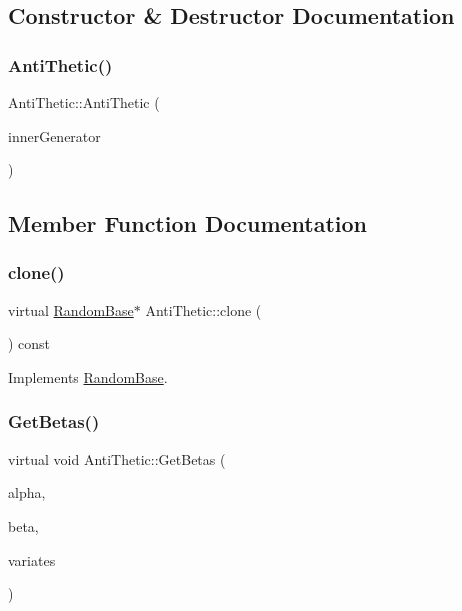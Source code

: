 \subsection{Constructor \& Destructor Documentation}
\hypertarget{classAntiThetic_aa79b36bdd2f341f5ad2b41f141950044}{}\label{classAntiThetic_aa79b36bdd2f341f5ad2b41f141950044} 
\subsubsection{\texorpdfstring{Anti\+Thetic()}{AntiThetic()}}
{\footnotesize\ttfamily Anti\+Thetic\+::\+Anti\+Thetic (\begin{DoxyParamCaption}\item[{const \hyperlink{classWrapper}{Wrapper}$<$ \hyperlink{classRandomBase}{Random\+Base} $>$ \&}]{inner\+Generator }\end{DoxyParamCaption})}



\subsection{Member Function Documentation}
\hypertarget{classAntiThetic_ab736855d3978fdc1ff914239cfc51a9d}{}\label{classAntiThetic_ab736855d3978fdc1ff914239cfc51a9d} 
\subsubsection{\texorpdfstring{clone()}{clone()}}
{\footnotesize\ttfamily virtual \hyperlink{classRandomBase}{Random\+Base}$\ast$ Anti\+Thetic\+::clone (\begin{DoxyParamCaption}{ }\end{DoxyParamCaption}) const\hspace{0.3cm}{\ttfamily [virtual]}}



Implements \hyperlink{classRandomBase_a0906f4590283535ec40427ad31ba7850}{Random\+Base}.

\hypertarget{classAntiThetic_a84fc41c2b4e5a1de78f3399e21c067f8}{}\label{classAntiThetic_a84fc41c2b4e5a1de78f3399e21c067f8} 
\subsubsection{\texorpdfstring{Get\+Betas()}{GetBetas()}}
{\footnotesize\ttfamily virtual void Anti\+Thetic\+::\+Get\+Betas (\begin{DoxyParamCaption}\item[{double}]{alpha,  }\item[{double}]{beta,  }\item[{\hyperlink{classMJArray}{M\+J\+Array} \&}]{variates }\end{DoxyParamCaption})\hspace{0.3cm}{\ttfamily [virtual]}}



